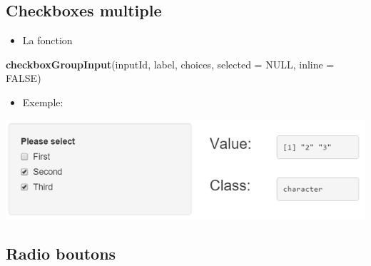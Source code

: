 \documentclass[]{article}
\newenvironment{Shaded}{\begin{snugshade}}{\end{snugshade}}
\newcommand{\KeywordTok}[1]{\textcolor[rgb]{0.13,0.29,0.53}{\textbf{#1}}}
\newcommand{\DataTypeTok}[1]{\textcolor[rgb]{0.13,0.29,0.53}{#1}}
\newcommand{\DecValTok}[1]{\textcolor[rgb]{0.00,0.00,0.81}{#1}}
\newcommand{\StringTok}[1]{\textcolor[rgb]{0.31,0.60,0.02}{#1}}
\newcommand{\CommentTok}[1]{\textcolor[rgb]{0.56,0.35,0.01}{\textit{#1}}}
\newcommand{\OtherTok}[1]{\textcolor[rgb]{0.56,0.35,0.01}{#1}}
\newcommand{\NormalTok}[1]{#1}
\providecommand{\tightlist}{%
  \setlength{\itemsep}{0pt}\setlength{\parskip}{0pt}}
\begin{document}
\subsection{Checkboxes multiple}\label{checkboxes-multiple}

\begin{itemize}
\tightlist
\item
  La fonction
\end{itemize}

\begin{Shaded}
\begin{Highlighting}[]
\KeywordTok{checkboxGroupInput}\NormalTok{(inputId, label, choices, }\DataTypeTok{selected =} \OtherTok{NULL}\NormalTok{, }\DataTypeTok{inline =} \OtherTok{FALSE}\NormalTok{)}
\end{Highlighting}
\end{Shaded}

\begin{itemize}
\tightlist
\item
  Exemple:
\end{itemize}

\begin{Shaded}
\end{Shaded}

\includegraphics{img/multiple_checkbox.png}

\subsection{Radio boutons}\label{radio-boutons}
\end{document}
